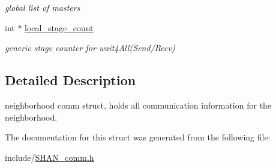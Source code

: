 \begin{DoxyCompactItemize}
\begin{DoxyCompactList}\small\item\em global list of masters \end{DoxyCompactList}\item 
int $\ast$ \hyperlink{structshan__neighborhood__t_a4fabbed69a9715f87876a36a4a88c26a}{local\+\_\+stage\+\_\+count}\hypertarget{structshan__neighborhood__t_a4fabbed69a9715f87876a36a4a88c26a}{}\label{structshan__neighborhood__t_a4fabbed69a9715f87876a36a4a88c26a}

\begin{DoxyCompactList}\small\item\em generic stage counter for wait4\+All(Send/\+Recv) \end{DoxyCompactList}\end{DoxyCompactItemize}


\subsection{Detailed Description}
neighborhood comm struct, holds all communication information for the neighborhood. 

The documentation for this struct was generated from the following file\+:\begin{DoxyCompactItemize}
\item 
include/\hyperlink{SHAN__comm_8h}{S\+H\+A\+N\+\_\+comm.\+h}\end{DoxyCompactItemize}
